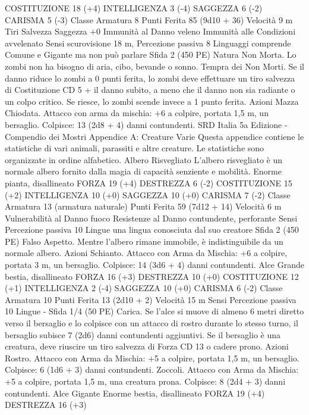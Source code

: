 \begin{multicols}{2}
COSTITUZIONE 18 (+4)
INTELLIGENZA 3 (-4)
SAGGEZZA 6 (-2)
CARISMA 5 (-3)
Classe Armatura 8
Punti Ferita 85 (9d10 + 36)
Velocità 9 m
Tiri Salvezza Saggezza +0
Immunità al Danno veleno
Immunità alle Condizioni avvelenato
Sensi scurovisione 18 m, Percezione passiva 8
Linguaggi comprende Comune e Gigante ma non può parlare
Sfida 2 (450 PE)
Natura Non Morta. Lo zombi non ha bisogno di aria, cibo,
bevande o sonno.
Tempra dei Non Morti. Se il danno riduce lo zombi a 0 punti
ferita, lo zombi deve effettuare un tiro salvezza di Costituzione
CD 5 + il danno subito, a meno che il danno non sia radiante o
un colpo critico. Se riesce, lo zombi scende invece a 1 punto
ferita.
Azioni
Mazza Chiodata. Attacco con arma da mischia: +6 a colpire,
portata 1,5 m, un bersaglio.
Colpisce: 13 (2d8 + 4) danni contundenti.
SRD Italia 5a Edizione - Compendio dei Mostri
Appendice A: Creature
Varie
Questa appendice contiene le statistiche di vari animali,
parassiti e altre creature. Le statistiche sono
organizzate in ordine alfabetico.
Albero Risvegliato
L’albero risvegliato è un normale albero fornito dalla
magia di capacità senziente e mobilità.
Enorme pianta, disallineato
FORZA 19 (+4)
DESTREZZA 6 (-2)
COSTITUZIONE 15 (+2)
INTELLIGENZA 10 (+0)
SAGGEZZA 10 (+0)
CARISMA 7 (-2)
Classe Armatura 13 (armatura naturale)
Punti Ferita 59 (7d12 + 14)
Velocità 6 m
Vulnerabilità al Danno fuoco
Resistenze al Danno contundente, perforante
Sensi Percezione passiva 10
Lingue una lingua conosciuta dal suo creatore
Sfida 2 (450 PE)
Falso Aspetto. Mentre l’albero rimane immobile, è
indistinguibile da un normale albero.
Azioni
Schianto. Attacco con Arma da Mischia: +6 a colpire, portata 3
m, un bersaglio.
Colpisce: 14 (3d6 + 4) danni contundenti.
Alce
Grande bestia, disallineato
FORZA 16 (+3)
DESTREZZA 10 (+0)
COSTITUZIONE 12 (+1)
INTELLIGENZA 2 (-4)
SAGGEZZA 10 (+0)
CARISMA 6 (-2)
Classe Armatura 10
Punti Ferita 13 (2d10 + 2)
Velocità 15 m
Sensi Percezione passiva 10
Lingue -
Sfida 1/4 (50 PE)
Carica. Se l’alce si muove di almeno 6 metri diretto verso il
bersaglio e lo colpisce con un attacco di rostro durante lo stesso
turno, il bersaglio subisce 7 (2d6) danni contundenti aggiuntivi.
Se il bersaglio è una creatura, deve riuscire un tiro salvezza di
Forza CD 13 o cadere prono.
Azioni
Rostro. Attacco con Arma da Mischia: +5 a colpire, portata 1,5
m, un bersaglio.
Colpisce: 6 (1d6 + 3) danni contundenti.
Zoccoli. Attacco con Arma da Mischia: +5 a colpire, portata 1,5
m, una creatura prona.
Colpisce: 8 (2d4 + 3) danni contundenti.
Alce Gigante
Enorme bestia, disallineato
FORZA 19 (+4)
DESTREZZA 16 (+3)

\end{multicols}
